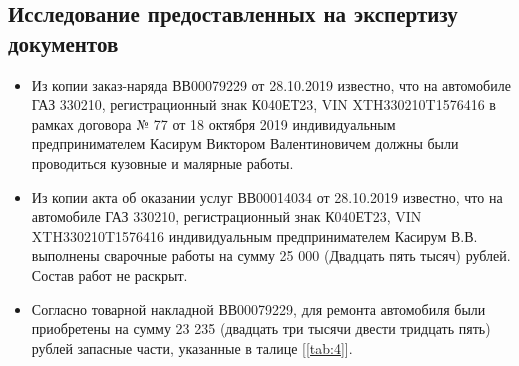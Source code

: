 \subsection{Исследование предоставленных на экспертизу документов}

\begin{itemize}
	\item Из копии заказ-наряда  ВВ00079229 от 28.10.2019 известно, что на автомобиле ГАЗ 330210, регистрационный знак К040ЕТ23, VIN XTH330210T1576416 в рамках договора № 77 от 18 октября 2019 индивидуальным предпринимателем Касирум Виктором Валентиновичем должны были  проводиться кузовные и малярные работы.
	\item Из копии акта об оказании услуг ВВ00014034 от 28.10.2019 известно, что на автомобиле ГАЗ 330210, регистрационный знак К040ЕТ23, VIN XTH330210T1576416 индивидуальным предпринимателем Касирум В.В. выполнены сварочные работы на сумму 25 000 (Двадцать пять тысяч) рублей. Состав работ не раскрыт. 
	\item Согласно товарной накладной ВВ00079229, для ремонта автомобиля были приобретены на сумму 23 235 (двадцать три тысячи двести тридцать пять) рублей	запасные части, указанные в талице [\ref{tab:4}].
\end{itemize}


